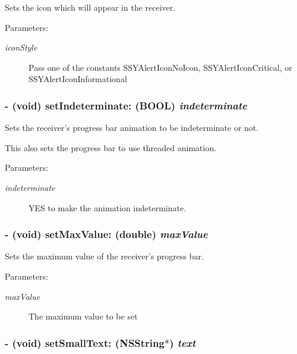Sets the icon which will appear in the receiver. 

\begin{Desc}
\item[Parameters:]
\begin{description}
\item[{\em iconStyle}]Pass one of the constants SSYAlertIconNoIcon, SSYAlertIconCritical, or SSYAlertIconInformational \end{description}
\end{Desc}
\hypertarget{interface_s_s_y_alert_45ca8f6438df88f90a5fdadbf0e9e8b4}{
\subsubsection[{setIndeterminate:}]{\setlength{\rightskip}{0pt plus 5cm}- (void) setIndeterminate: (BOOL) {\em indeterminate}}}
\label{interface_s_s_y_alert_45ca8f6438df88f90a5fdadbf0e9e8b4}


Sets the receiver's progress bar animation to be indeterminate or not. 

This also sets the progress bar to use threaded animation. \begin{Desc}
\item[Parameters:]
\begin{description}
\item[{\em indeterminate}]YES to make the animation indeterminate. \end{description}
\end{Desc}
\hypertarget{interface_s_s_y_alert_a581989651d0253051484d8b87c4b9db}{
\subsubsection[{setMaxValue:}]{\setlength{\rightskip}{0pt plus 5cm}- (void) setMaxValue: (double) {\em maxValue}}}
\label{interface_s_s_y_alert_a581989651d0253051484d8b87c4b9db}


Sets the maximum value of the receiver's progress bar. 

\begin{Desc}
\item[Parameters:]
\begin{description}
\item[{\em maxValue}]The maximum value to be set \end{description}
\end{Desc}
\hypertarget{interface_s_s_y_alert_48bbcefe2f439c4185d19c5d34a744c1}{
\subsubsection[{setSmallText:}]{\setlength{\rightskip}{0pt plus 5cm}- (void) setSmallText: (NSString$\ast$) {\em text}}}
\label{interface_s_s_y_alert_48bbcefe2f439c4185d19c5d34a744c1}


